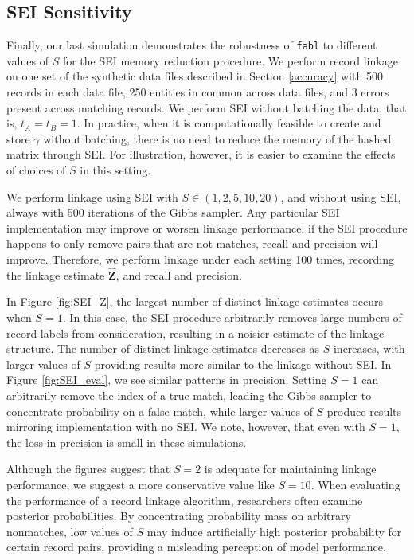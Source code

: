 \documentclass[ba]{imsart}
\begin{document}
	\hypertarget{SEI-sensitivity}{%
	\subsection{SEI Sensitivity}\label{SEI-sensitivity}}

Finally, our last simulation demonstrates the robustness of \texttt{fabl} to different values of $S$ for the SEI memory reduction procedure. We perform record linkage on one set of the synthetic data files described in Section \ref{accuracy} with 500 records in each data file, 250 entities in common across data files, and 3 errors present across matching records. We perform SEI without batching the data, that is, $t_A = t_B = 1$. In practice, when it is computationally feasible to create and store $\gamma$ without batching, there is no need to reduce the memory of the hashed matrix through SEI. For illustration, however, it is easier to examine the effects of choices of $S$ in this setting.

We perform linkage using SEI with $S \in (1, 2, 5, 10, 20)$, and without using SEI, always with 500 iterations of the Gibbs sampler. Any particular SEI implementation may improve or worsen linkage performance; if the SEI procedure happens to only remove pairs that are not matches, recall and precision will improve. Therefore, we perform linkage under each setting 100 times, recording the linkage estimate $\hat{\bm{Z}}$, and recall and precision.

In Figure \ref{fig:SEI_Z}, the largest number of distinct linkage estimates occurs when $S = 1$. In this case, the SEI procedure arbitrarily removes large numbers of record labels from consideration, resulting in a noisier estimate of the linkage structure. The number of distinct linkage estimates decreases as $S$ increases, with larger values of $S$ providing results more similar to the linkage without SEI. In Figure \ref{fig:SEI_eval}, we see similar patterns in precision. Setting $S=1$ can arbitrarily remove the index of a true match, leading the Gibbs sampler to concentrate probability on a false match, while larger values of $S$ produce results mirroring implementation with no SEI. We note, however, that even with $S=1$, the loss in precision is small in these simulations.

Although the figures suggest that $S=2$ is adequate for maintaining linkage performance, we suggest a more conservative value like $S=10$. When evaluating the performance of a record linkage algorithm, researchers often examine posterior probabilities. By concentrating probability mass on arbitrary nonmatches, low values of $S$ may induce artificially high posterior probability for certain record pairs, providing a misleading perception of model performance. 
\end{document}
